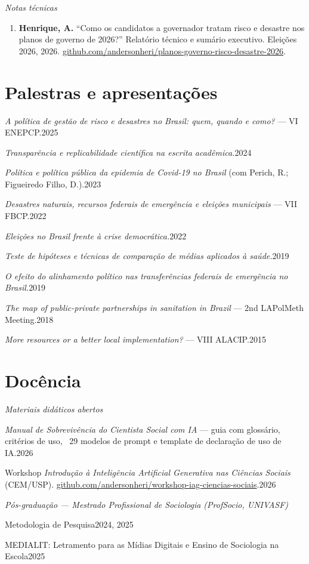 \documentclass[11pt]{article}
\newcommand{\cvsubsection}[1]{\vspace{0.9em}\textit{#1}\par\vspace{0.35em}}
\newcommand{\entryplain}[2]{\noindent#1\hfill #2\par\vspace{0.15em}}
\begin{document}
\cvsubsection{Notas técnicas}
\begin{enumerate}[leftmargin=0.3in,itemsep=0.4em,parsep=0pt]
\item \textbf{Henrique, A.} ``Como os candidatos a governador tratam risco e desastre nos planos de governo de 2026?'' Relatório técnico e sumário executivo. Eleições 2026, 2026. \href{https://github.com/andersonheri/planos-governo-risco-desastre-2026}{github.com/andersonheri/planos-governo-risco-desastre-2026}.
\end{enumerate}

\section{Palestras e apresentações}

\entryplain{\textit{A política de gestão de risco e desastres no Brasil: quem, quando e como?} --- VI ENEPCP.}{2025}
\entryplain{\textit{Transparência e replicabilidade científica na escrita acadêmica.}}{2024}
\entryplain{\textit{Política e política pública da epidemia de Covid-19 no Brasil} (com Perich, R.; Figueiredo Filho, D.).}{2023}
\entryplain{\textit{Desastres naturais, recursos federais de emergência e eleições municipais} --- VII FBCP.}{2022}
\entryplain{\textit{Eleições no Brasil frente à crise democrática.}}{2022}
\entryplain{\textit{Teste de hipóteses e técnicas de comparação de médias aplicados à saúde.}}{2019}
\entryplain{\textit{O efeito do alinhamento político nas transferências federais de emergência no Brasil.}}{2019}
\entryplain{\textit{The map of public-private partnerships in sanitation in Brazil} --- 2nd LAPolMeth Meeting.}{2018}
\entryplain{\textit{More resources or a better local implementation?} --- VIII ALACIP.}{2015}

\section{Docência}

\cvsubsection{Materiais didáticos abertos}
\entryplain{\textit{Manual de Sobrevivência do Cientista Social com IA} --- guia com glossário, critérios de uso, ~29 modelos de prompt e template de declaração de uso de IA.}{2026}
\entryplain{Workshop \textit{Introdução à Inteligência Artificial Generativa nas Ciências Sociais} (CEM/USP). \href{https://github.com/andersonheri/workshop-iag-ciencias-sociais}{github.com/andersonheri/workshop-iag-ciencias-sociais}.}{2026}

\vspace{0.9em}
\cvsubsection{Pós-graduação --- Mestrado Profissional de Sociologia (ProfSocio, UNIVASF)}
\entryplain{Metodologia de Pesquisa}{2024, 2025}
\entryplain{MEDIALIT: Letramento para as Mídias Digitais e Ensino de Sociologia na Escola}{2025}
\end{document}
